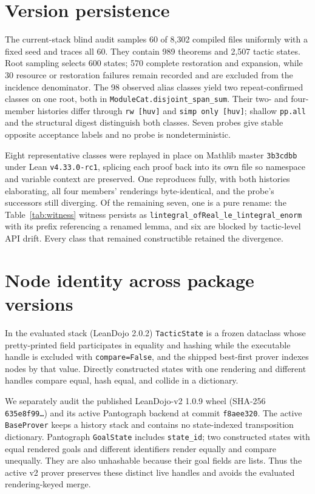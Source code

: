 \documentclass[11pt]{article}
\begin{document}
\section{Version persistence}
\label{app:persist}
The current-stack blind audit samples 60 of 8{,}302 compiled files uniformly
with a fixed seed and traces all 60. They contain 989 theorems and 2{,}507
tactic states. Root sampling selects 600 states; 570 complete restoration and
expansion, while 30 resource or restoration failures remain recorded and are
excluded from the incidence denominator. The 98 observed alias classes yield
two repeat-confirmed classes on one root, both in
\texttt{ModuleCat.disjoint\_span\_sum}. Their two- and four-member histories
differ through \texttt{rw [huv]} and \texttt{simp only [huv]}; shallow
\texttt{pp.all} and the structural digest distinguish both classes. Seven
probes give stable opposite acceptance labels and no probe is nondeterministic.

Eight representative classes were replayed in place on Mathlib master
\texttt{3b3cdbb} under Lean \texttt{v4.33.0-rc1}, splicing each proof back into
its own file so namespace and variable context are preserved. One reproduces
fully, with both histories elaborating, all four members' renderings
byte-identical, and the probe's successors still diverging. Of the remaining
seven, one is a pure rename: the Table~\ref{tab:witness} witness persists as
\texttt{lintegral\_\allowbreak ofReal\_\allowbreak le\_\allowbreak lintegral\_\allowbreak enorm} with its prefix referencing a
renamed lemma, and six are blocked by tactic-level API drift. Every class that
remained constructible retained the divergence.

\section{Node identity across package versions}
\label{app:identity}
In the evaluated stack (LeanDojo 2.0.2) \texttt{TacticState} is a frozen
dataclass whose pretty-printed field participates in equality and hashing while
the executable handle is excluded with \texttt{compare=False}, and the shipped
best-first prover indexes nodes by that value. Directly constructed states with
one rendering and different handles compare equal, hash equal, and collide in a
dictionary.

We separately audit the published LeanDojo-v2 1.0.9 wheel (SHA-256
\texttt{635e8f99\ldots}) and its active Pantograph backend at commit
\texttt{f8aee320}. The active \texttt{BaseProver} keeps a history stack and
contains no state-indexed transposition dictionary. Pantograph
\texttt{GoalState} includes \texttt{state\_id}; two constructed states with
equal rendered goals and different identifiers render equally and compare
unequally. They are also unhashable because their goal fields are lists. Thus
the active v2 prover preserves these distinct live handles and avoids the
evaluated rendering-keyed merge.
\end{document}
